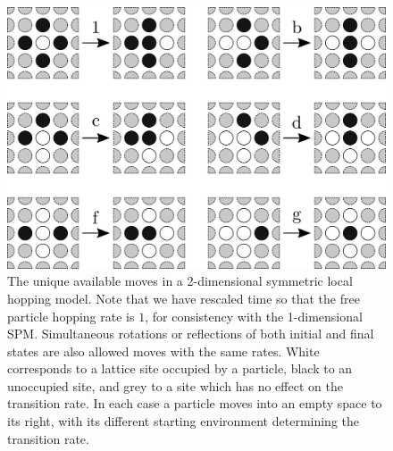 \begin{figure}[h!]
 \caption[The possibe transitions which may occur in a symmetric local 2-dimensional hopping model.]{\label{fig:2dTransitions} 
 The unique available moves in a 2-dimensional symmetric local hopping model. Note that we have rescaled time so that the free particle hopping rate is $1$, for consistency with the 1-dimensional SPM.
 Simultaneous rotations or reflections of both initial and final states are also allowed moves with the same rates. White corresponds to a lattice site occupied by a particle, black to an unoccupied site, and grey to a site
 which has no effect on the transition rate. In each case a particle moves into an empty space to its right, with its different starting environment determining the transition rate.}
 \includegraphics[width=0.99\linewidth]{analytics/images/2dGenericRates}
\end{figure}


